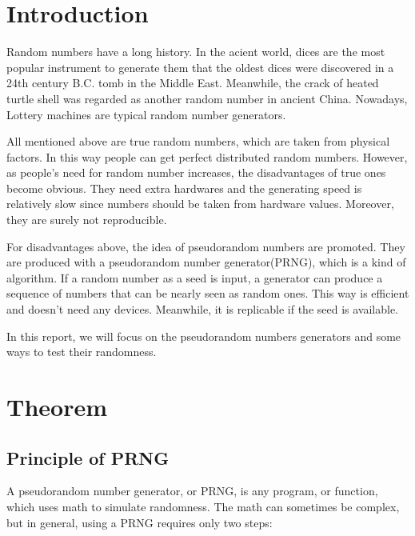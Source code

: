 \documentclass[12pt,a4paper]{article}
\begin{document}



\section{Introduction}

Random numbers have a long history. In the acient world, dices are the most popular instrument to generate them that the oldest dices were discovered in a 24th century B.C. tomb in the Middle East. Meanwhile, the crack of heated turtle shell was regarded as another random number in ancient China. Nowadays, Lottery machines are typical random number generators.

All mentioned above are true random numbers, which are taken from physical factors. In this way people can get perfect distributed random numbers. However, as people's need for random number increases, the disadvantages of true ones become obvious. They need extra hardwares and the generating speed is relatively slow since numbers should be taken from hardware values. Moreover, they are surely not reproducible. 

For disadvantages above, the idea of pseudorandom numbers are promoted. They are produced with a pseudorandom number generator(PRNG), which is a kind of algorithm. If a random number as a seed is input, a generator can produce a sequence of numbers that can be nearly seen as random ones. This way is efficient and doesn't need any devices. Meanwhile, it is replicable if the seed is available. 

In this report, we will focus on the pseudorandom numbers generators and some ways to test their randomness. 


\section{Theorem}

\subsection{Principle of PRNG}

A pseudorandom number generator, or PRNG, is any program, or function, which uses math to simulate randomness. The math can sometimes be complex, but in general, using a PRNG requires only two steps:
\end{document}
